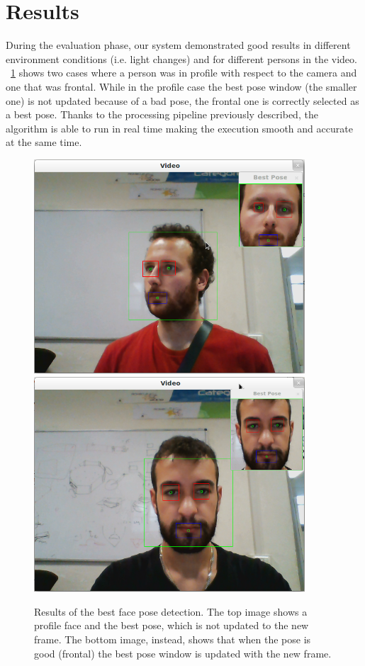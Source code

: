 \documentclass[10pt,a4paper]{report}
\begin{document}
\section*{Results}
During the evaluation phase, our system demonstrated good results in different environment conditions (i.e. light changes) and for different persons in the video. \figurename~\ref{fig:best_pose} shows two cases where a person was in profile with respect to the camera and one that was frontal. While in the profile case the best pose window (the smaller one) is not updated because of a bad pose, the frontal one is correctly selected as a best pose. Thanks to the processing pipeline previously described, the algorithm is able to run in real time making the execution smooth and accurate at the same time.
\begin{figure}
\centering
\includegraphics[width=0.9\textwidth]{./best_face_jacopo.png}
\includegraphics[width=0.9\textwidth]{./best_face_rob.png}
\caption{Results of the best face pose detection. The top image shows a profile face and the best pose, which is not updated to the new frame. The bottom image, instead, shows that when the pose is good (frontal) the best pose window is updated with the new frame.}
\label{fig:best_pose}
\end{figure}
\end{document}

